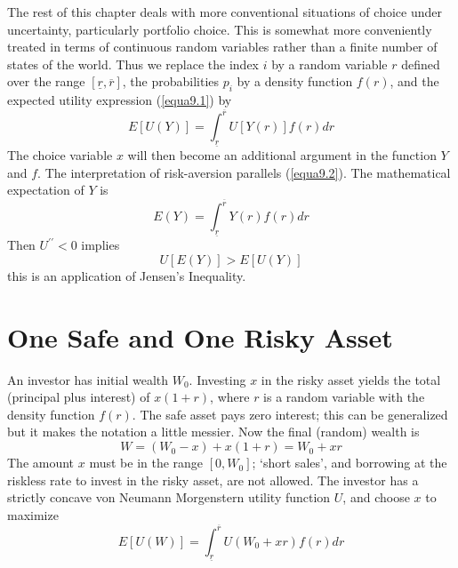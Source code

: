The rest of this chapter deals with more conventional situations of choice under uncertainty, particularly portfolio choice. This is somewhat more conveniently treated in terms of continuous random variables rather than a finite number of states of the world. Thus we replace the index $i$ by a random variable $r$ defined over the range $[\underline{r}, \overline{r}]$, the probabilities $p_i$ by a density function $f(r)$, and the expected utility expression (\ref{equa9.1}) by 
\begin{equation} \label{equa9.4}
  E[U(Y)]  = \int_{\underline{r}}^{\overline{r}} U[Y(r)] f(r) dr
\end{equation}
The choice variable $x$ will then become an additional argument in the function $Y$ and $f$. The interpretation of risk-aversion parallels (\ref{equa9.2}). The mathematical expectation of $Y$ is 
\begin{equation*}
E(Y) = \int_{\underline{r}}^{\overline{r}} Y(r) f(r) dr
\end{equation*}
Then $U^{\prime \prime}  < 0$ implies
\begin{equation} \label{equa9.5}
 U[E(Y)] > E[U(Y)]
\end{equation}
this is an application of Jensen's Inequality.

\section*{One Safe and One Risky Asset}

An investor has initial wealth $W_0$. Investing $x$ in the risky asset yields the total (principal plus interest) of $x(1+r)$, where $r$ is a random variable with the density function $f(r)$. The safe asset pays zero interest; this can be generalized but it makes the notation a little messier. Now the final (random) wealth is 
\begin{equation} \label{equa9.6}
 W= (W_0 -x) + x(1+r) = W_0 + xr
\end{equation}
The amount $x$ must be in the range $[0, W_0]$; `short sales', and borrowing at the riskless rate to invest in the risky asset, are not allowed. The investor has a strictly concave von Neumann Morgenstern utility function $U$, and choose $x$ to maximize 
\begin{equation} \label{equa9.7}
E[U(W)] = \int_{\underline{r}}^{\overline{r}} U(W_0 +xr) f(r) dr
\end{equation}

